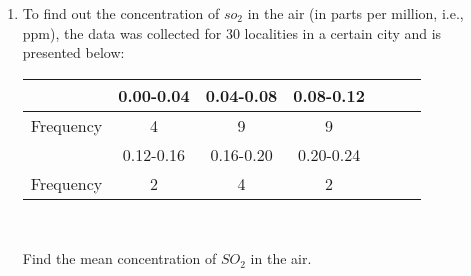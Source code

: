 \renewcommand{\theequation}{\theenumi}
\begin{enumerate}[label=\arabic*.,ref=\thesubsection.\theenumi]
	\item To find out the concentration of $so_2$ in the air (in parts per million, i.e., ppm), the data was collected for 30 localities in a certain city and is presented below:
	\begin{table}[!ht]
	\begin{tabular}{|c|c|c|c|c|c|c|}
		\hline
		\vtop{\hbox{\strut Concentration}\hbox{\strut $SO_2$(in ppm)}}&0.00-0.04&0.04-0.08&0.08-0.12\\
		\hline
		Frequency&4&9&9\\
		\hline
		\vtop{\hbox{\strut Concentration}\hbox{\strut $SO_2$(in ppm)}}&0.12-0.16&0.16-0.20& 
		0.20-0.24 \\
		\hline
		Frequency&2&4&2\\
		\hline
	\end{tabular}
\end{table}\\
	\par Find the mean concentration of $SO_2$ in the air.
\end{enumerate}